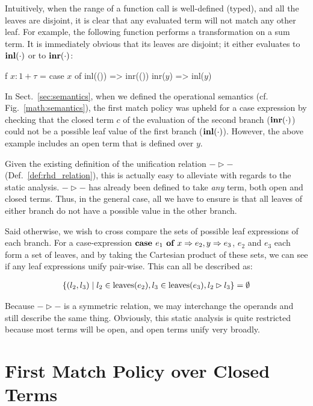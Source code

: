 Intuitively, when the range of a function call is well-defined (typed), and all
the leaves are disjoint, it is clear that any evaluated term will not match any
other leaf. For example, the following function performs a transformation on a
sum term. It is immediately obvious that its leaves are disjoint; it either
evaluates to $\textbf{inl}(\cdot)$ or to $\textbf{inr}(\cdot)$:

\begin{rfuncode}
f $x : 1 + \tau$ = case $x$ of
                inl(()) => inr(())
                inr($y$) => inl($y$)
\end{rfuncode}

In Sect.~\ref{sec:semantics}, when we defined the operational semantics (cf.
Fig.~\ref{math:semantics}), the first match policy was upheld for a case
expression by checking that the closed term $c$ of the evaluation of the second
branch ($\textbf{inr}(\cdot)$) could not be a possible leaf value of the first branch
($\textbf{inl}(\cdot)$). However, the above example includes an open term that is
defined over $y$.

Given the existing definition of the unification relation $- \rhd -$
(Def.~\ref{def:rhd_relation}), this is actually easy to alleviate with regards
to the static analysis. $- \rhd -$ has already been defined to take \emph{any}
term, both open and closed terms. Thus, in the general case, all we have to
ensure is that all leaves of either branch do not have a possible value in the
other branch.

Said otherwise, we wish to cross compare the sets of possible leaf expressions
of each branch. For a case-expression $\textbf{case } e_1 \textbf{ of } x \Rightarrow e_2, y \Rightarrow e_3$, $e_2$ and
$e_3$ each form a set of leaves, and by taking the Cartesian product of these
sets, we can see if any leaf expressions unify pair-wise.  This can all be
described as:

\begin{align}
  \{ (l_2, l_3) \mid l_2 \in \text{leaves}(e_2)
                   , l_3 \in \text{leaves}(e_3)
                   , l_2 \rhd l_3 \}
  = \emptyset
  \label{eq:leaves_ortho}
\end{align}

Because $- \rhd -$ is a symmetric relation, we may interchange the operands and
still describe the same thing. Obviously, this static analysis is quite
restricted because most terms will be open, and open terms unify very broadly.

\section{First Match Policy over Closed Terms}


